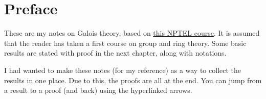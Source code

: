 \chapter*{Preface}
These are my notes on Galois theory, based on \href{https://nptel.ac.in/courses/111101001}{this NPTEL course}. It is assumed that the reader has taken a first course on group and ring theory. Some basic results are stated with proof in the next chapter, along with notations. 

I had wanted to make these notes (for my reference) as a way to collect the results in one place. Due to this, the proofs are all at the end. You can jump from a result to a proof (and back) using the hyperlinked arrows.